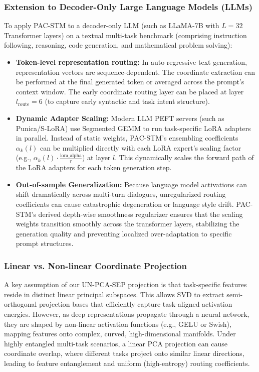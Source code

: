 \subsubsection{Extension to Decoder-Only Large Language Models (LLMs)}
To apply PAC-STM to a decoder-only LLM (such as LLaMA-7B with $L=32$ Transformer layers) on a textual multi-task benchmark (comprising instruction following, reasoning, code generation, and mathematical problem solving):
\begin{itemize}
    \item \textbf{Token-level representation routing:} In auto-regressive text generation, representation vectors are sequence-dependent. The coordinate extraction can be performed at the final generated token or averaged across the prompt's context window. The early coordinate routing layer can be placed at layer $l_{\text{route}} = 6$ (to capture early syntactic and task intent structure).
    \item \textbf{Dynamic Adapter Scaling:} Modern LLM PEFT servers (such as Punica/S-LoRA) use Segmented GEMM to run task-specific LoRA adapters in parallel. Instead of static weights, PAC-STM's ensembling coefficients $\alpha_k(l)$ can be multiplied directly with each LoRA expert's scaling factor (e.g., $\alpha_k(l) \cdot \frac{\text{lora\_alpha}}{r}$) at layer $l$. This dynamically scales the forward path of the LoRA adapters for each token generation step.
    \item \textbf{Out-of-sample Generalization:} Because language model activations can shift dramatically across multi-turn dialogues, unregularized routing coefficients can cause catastrophic degeneration or language style drift. PAC-STM's derived depth-wise smoothness regularizer ensures that the scaling weights transition smoothly across the transformer layers, stabilizing the generation quality and preventing localized over-adaptation to specific prompt structures.
\end{itemize}

\subsubsection{Linear vs. Non-linear Coordinate Projection}
A key assumption of our UN-PCA-SEP projection is that task-specific features reside in distinct linear principal subspaces. This allows SVD to extract semi-orthogonal projection bases that efficiently capture task-aligned activation energies. However, as deep representations propagate through a neural network, they are shaped by non-linear activation functions (e.g., GELU or Swish), mapping features onto complex, curved, high-dimensional manifolds. Under highly entangled multi-task scenarios, a linear PCA projection can cause coordinate overlap, where different tasks project onto similar linear directions, leading to feature entanglement and uniform (high-entropy) routing coefficients.

